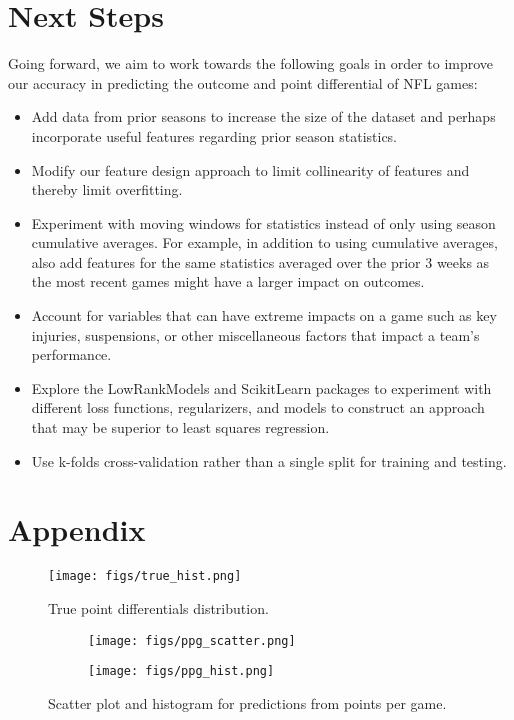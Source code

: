 \documentclass{article}
\begin{document}
\section{Next Steps}
Going forward, we aim to work towards the following goals in order to improve our accuracy in predicting the outcome and point differential of NFL games:
\begin{itemize}
  \item Add data from prior seasons to increase the size of the dataset and perhaps incorporate useful features regarding prior season statistics.
  \item Modify our feature design approach to limit collinearity of features and thereby limit overfitting.
  \item Experiment with moving windows for statistics instead of only using season cumulative averages. For example, in addition to using cumulative averages, also add features for the same statistics averaged over the prior 3 weeks as the most recent games might have a larger impact on outcomes.
  \item Account for variables that can have extreme impacts on a game such as key injuries, suspensions, or other miscellaneous factors that impact a team’s performance.
  \item Explore the LowRankModels and ScikitLearn packages to experiment with different loss functions, regularizers, and models to construct an approach that may be superior to least squares regression.
  \item Use k-folds cross-validation rather than a single split for training and testing.
\end{itemize}
\pagebreak

\section{Appendix}

\begin{figure}[h!]
\centering 
 \texttt{[image: figs/true\_hist.png]}
 \caption{True point differentials distribution.}
\label{fig:real}
\end{figure}

\begin{figure}[h!]
\centering
\begin{subfigure}{.5\textwidth}
  \centering
  \texttt{[image: figs/ppg\_scatter.png]}
  \caption{}
  \label{fig:ppg1}
\end{subfigure}%
\begin{subfigure}{.5\textwidth}
  \centering
  \texttt{[image: figs/ppg\_hist.png]}
  \caption{}
  \label{fig:ppg2}
\end{subfigure}
\caption{Scatter plot and histogram for predictions from points per game.}
\label{fig:ppg}
\end{figure}
\end{document}
